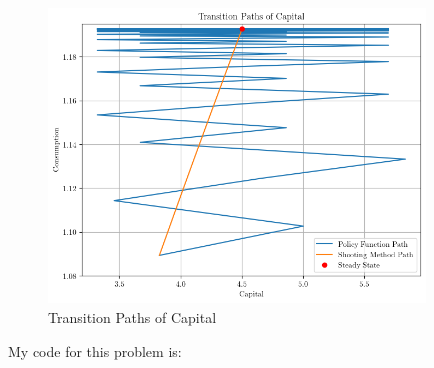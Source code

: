 \documentclass[10pt]{article}
\begin{document}
\begin{enumerate}
	\begin{figure}[H]
		\centering
		\includegraphics[width=10cm]{macro_hw1_code/transition_paths.png}
		\caption{Transition Paths of Capital}
		\label{fig:transition_paths}
	\end{figure}
\end{enumerate}

My code for this problem is:


\end{document}
